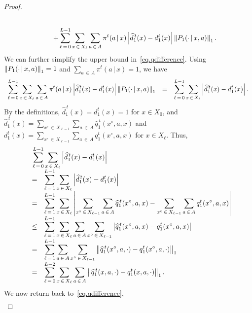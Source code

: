 \documentclass[12pt, final]{l4dc2023}
\begin{document}
\begin{proof}
\begin{equation}
\begin{array}{rcl}
	\\[0.2cm]
	&&\displaystyle+ \sum_{\ell\,=\,0}^{L-1}\sum_{x\,\in\,X_\ell}\sum_{a\,\in\,A} \pi^t(a\,\vert\,x)  \left|\widehat d_1^{\,t}(x) - d_1^t(x) \right|\left\|{P_1(\cdot\,\vert\,x,a) }\right\|_1.
	\end{array}
	\end{equation}
	We can further simplify the upper bound in~\eqref{eq.qdifference}. Using $\left\|{P_1(\cdot\,\vert\,x,a) }\right\|_1=1$ and $\sum_{a\,\in\,A} \pi^t(a\,\vert\,x) =1$, we have
	\[
	\begin{array}{rcl}
	\displaystyle\sum_{\ell\,=\,0}^{L-1}\sum_{x\,\in\,X_\ell}\sum_{a\,\in\,A} \pi^t(a\,\vert\,x)  \left|\widehat d_1^{\,t} (x) - d_1^t(x) \right|\left\|{P_1(\cdot\,\vert\,x,a) }\right\|_1
	&=& \displaystyle \sum_{\ell\,=\,0}^{L-1}\sum_{x\,\in\,X_\ell}\left|\widehat d_1^{\,t}(x) - d_1^t(x) \right|.
	\end{array}
	\]
	By the definitions, $\hat d_1^{\,t}(x) = d_1^t(x) =1$ for $x\in X_0$, and $\hat d_1^{\,t}(x)=\sum_{x^\circ\,\in\,X_{\ell-1}}\sum_{a\,\in\, A}\hat q_1^{\,t} (x^\circ,a,x)$ and $d_1^t(x)=\sum_{x^\circ\,\in\,X_{\ell-1}}\sum_{a\,\in\, A} q_1^t (x^\circ,a,x)$ for $x\in X_\ell$. Thus, 
	\[
	\begin{array}{rcl}
	&& \!\!\!\! \!\!\!\! \!\!
	\displaystyle \sum_{\ell\,=\,0}^{L-1}\sum_{x\,\in\,X_\ell}\abr{\hat d_1^{\,t} (x) - d_1^t(x) }
	\\[0.2cm]
	&=& \displaystyle \sum_{\ell\,=\,1}^{L-1}\sum_{x\,\in\,X_\ell}\abr{\hat d_1^{\,t} (x) - d_1^t(x) }
	\\[0.2cm]
	&=& \displaystyle \sum_{\ell\,=\,1}^{L-1}\sum_{x\,\in\,X_\ell}\abr{\sum_{x^\circ\,\in\,X_{\ell-1}}\sum_{a\,\in\, A}\hat q_1^{\,t} (x^\circ,a,x)- \sum_{x^\circ\,\in\,X_{\ell-1}}\sum_{a\,\in\, A} q_1^t (x^\circ,a,x)}
	\\[0.2cm]
	&\leq& \displaystyle \sum_{\ell\,=\,1}^{L-1}\sum_{x\,\in\,X_\ell} \sum_{a\,\in\, A} \sum_{x^\circ\,\in\,X_{\ell-1}}\abr{ \hat q_1^{\,t} (x^\circ,a,x) - q_1^t (x^\circ,a,x) } 
	\\[0.2cm]
	&=& \displaystyle \sum_{\ell\,=\,1}^{L-1}\sum_{a\,\in\, A} \sum_{x^\circ\,\in\,X_{\ell-1}}\norm{ \hat q_1^{\,t} (x^\circ,a,\cdot) - q_1^t (x^\circ,a,\cdot) }_1
	\\[0.2cm]
	&=& \displaystyle \sum_{\ell\,=\,0}^{L-2}\sum_{x\,\in\,X_{\ell}}\sum_{a\,\in\, A}  \norm{ \hat q_1^{\,t} (x,a,\cdot) - q_1^t (x,a,\cdot) }_1.
	\end{array}
	\]
	We now return back to~\eqref{eq.qdifference}, 
	\begin{equation}\label{eq.qdifference_simplified}
	\begin{array}{rcl}

\end{array}
\end{equation}
\end{proof}
\end{document}
